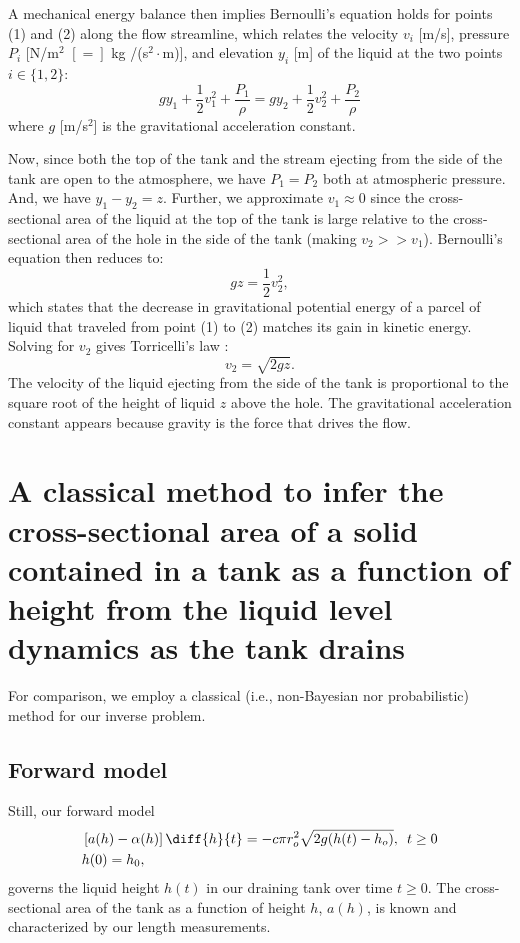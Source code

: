 \documentclass[a4paper,fleqn]{cas-sc}
\begin{document}
	A mechanical energy balance then implies Bernoulli's equation \cite{welty2020fundamentals} holds for points (1) and (2) along the flow streamline, which relates the velocity $v_i$ [m/s], pressure $P_i$ [N/m$^2$ $[=]$ kg /(s$^2\cdot$m)], and elevation $y_i$ [m] of the liquid at the two points $i\in\{1,2\}$:
	\begin{equation}
	g y_1 + \frac{1}{2} v_1^2 + \frac{P_1}{\rho} = gy_2 + \frac{1}{2} v_2^2 + \frac{P_2}{\rho} 
	\end{equation}
	where $g$ [m/s$^2$] is the gravitational acceleration constant. 
	
	Now, since both the top of the tank and the stream ejecting from the side of the tank are open to the atmosphere, we have $P_1=P_2$ both at atmospheric pressure. And, we have $y_1-y_2=z$. Further, we approximate $v_1\approx 0$ since the cross-sectional area of the liquid at the top of the tank is large relative to the cross-sectional area of the hole in the side of the tank (making $v_2 >> v_1$). Bernoulli's equation then reduces to:
	\begin{equation}
	g z  = \frac{1}{2} v_2^2,
	\end{equation}
	which states that the decrease in gravitational potential energy of a parcel of liquid that traveled from point (1) to (2) matches its gain in kinetic energy. Solving for $v_2$ gives Torricelli's law \cite{driver1998torricelli}:
	\begin{equation}
	v_2 = \sqrt{2gz}.
	\end{equation}
	The velocity of the liquid ejecting from the side of the tank is proportional to the square root of the height of liquid $z$ above the hole. The gravitational acceleration constant appears because gravity is the force that drives the flow.
	
\clearpage
	
\section{
A classical method 
to infer the 
cross-sectional area of a solid contained in a tank as a function of height
from the liquid level dynamics as the tank drains}
For comparison, we employ a classical (i.e., non-Bayesian nor probabilistic) method for our inverse problem.

 \subsection{Forward model} Still, our forward model
\begin{align}
& \left[ a(h)-\alpha(h)\right] \diff{h}{t}= -c \pi r_o^2 \sqrt{2g (h(t)-h_o)}, \,\,\, t \geq 0\label{eq:SI_model} \\
& h(0)=h_0, \nonumber 
\end{align}
 governs the liquid height $h(t)$ in our draining tank over time $t \geq 0$.
 The cross-sectional area of the tank as a function of height $h$, $a(h)$, is known and characterized by our length measurements.
 
\end{document}
